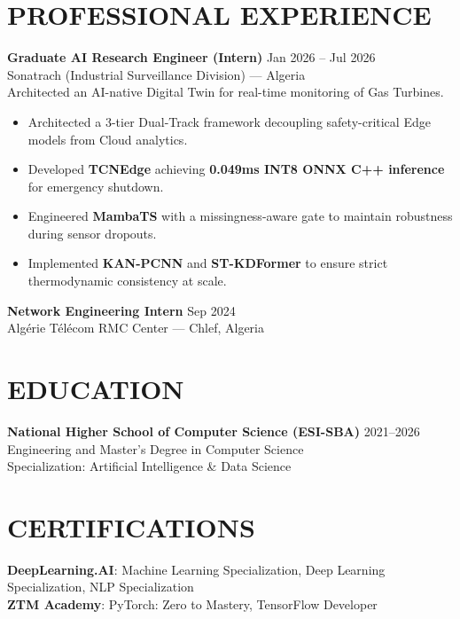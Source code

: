 \documentclass[a4paper,12pt]{article}
\begin{document}
\section{PROFESSIONAL EXPERIENCE}
\textbf{Graduate AI Research Engineer (Intern)} \hfill Jan 2026 -- Jul 2026 \\
Sonatrach (Industrial Surveillance Division) — Algeria \\
Architected an AI-native Digital Twin for real-time monitoring of Gas Turbines.
\begin{itemize}
    \item Architected a 3-tier Dual-Track framework decoupling safety-critical Edge models from Cloud analytics.
    \item Developed \textbf{TCNEdge} achieving \textbf{0.049ms INT8 ONNX C++ inference} for emergency shutdown.
    \item Engineered \textbf{MambaTS} with a missingness-aware gate to maintain robustness during sensor dropouts.
    \item Implemented \textbf{KAN-PCNN} and \textbf{ST-KDFormer} to ensure strict thermodynamic consistency at scale.
\end{itemize}

\vspace{8pt}
\textbf{Network Engineering Intern} \hfill Sep 2024 \\
Algérie Télécom RMC Center — Chlef, Algeria

\section{EDUCATION}
\textbf{National Higher School of Computer Science (ESI-SBA)} \hfill 2021--2026 \\
Engineering and Master’s Degree in Computer Science \\
Specialization: Artificial Intelligence \& Data Science

\section{CERTIFICATIONS}
\textbf{DeepLearning.AI}: Machine Learning Specialization, Deep Learning Specialization, NLP Specialization \\[6pt]
\textbf{ZTM Academy}: PyTorch: Zero to Mastery, TensorFlow Developer

\newpage
\end{document}
